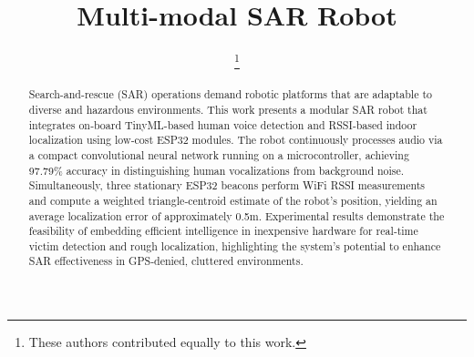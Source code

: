 \documentclass[conference]{IEEEtran}
\begin{document}
\title{Multi-modal SAR Robot}

\author{
    \thanks{These authors contributed equally to this work.}
}

\maketitle

\begin{abstract}
Search-and-rescue (SAR) operations demand robotic platforms that are adaptable to diverse and hazardous environments. This work presents a modular SAR robot that integrates on‑board TinyML-based human voice detection and RSSI‑based indoor localization using low‑cost ESP32 modules. The robot continuously processes audio via a compact convolutional neural network running on a microcontroller, achieving 97.79\% accuracy in distinguishing human vocalizations from background noise. Simultaneously, three stationary ESP32 beacons perform WiFi RSSI measurements and compute a weighted triangle‑centroid estimate of the robot’s position, yielding an average localization error of approximately 0.5m. Experimental results demonstrate the feasibility of embedding efficient intelligence in inexpensive hardware for real‑time victim detection and rough localization, highlighting the system’s potential to enhance SAR effectiveness in GPS‑denied, cluttered environments.
\end{abstract}
\end{document}
